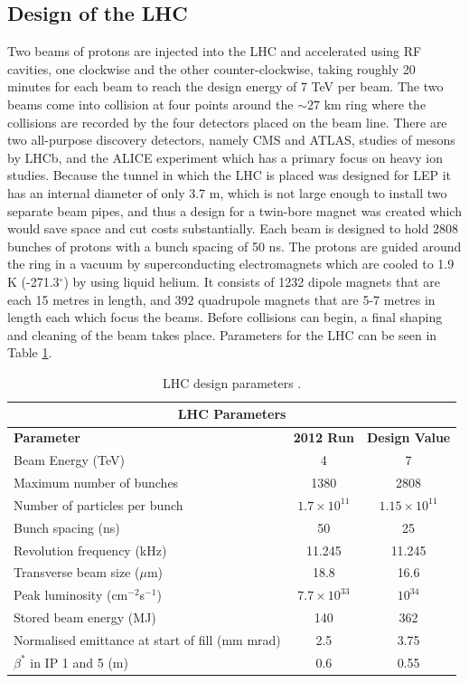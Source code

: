 \subsection{Design of the LHC}

Two beams of protons are injected into the LHC and accelerated using RF cavities, one clockwise and the other counter-clockwise, taking roughly 20 minutes for each beam to reach the design energy of 7 TeV per beam. The two beams come into collision at four points around the $\sim27$ km ring where the collisions are recorded by the four detectors placed on the beam line. There are two all-purpose discovery detectors, namely CMS and ATLAS, studies of mesons by LHCb, and the ALICE experiment which has a primary focus on heavy ion studies. Because the tunnel in which the LHC is placed was designed for LEP it has an internal diameter of only 3.7 m, which is not large enough to install two separate beam pipes, and thus a design for a twin-bore magnet \cite{LHCStorageAccelerators} was created which would save space and cut costs substantially. Each beam is designed to hold 2808 bunches of protons with a bunch spacing of 50 ns. The protons are guided around the ring in a vacuum by superconducting electromagnets which are cooled to 1.9 K (-271.3$^\circ$) by using liquid helium. It consists of 1232 dipole magnets that are each 15 metres in length, and 392 quadrupole magnets that are 5-7 metres in length each which focus the beams. Before collisions can begin, a final shaping and cleaning of the beam takes place. Parameters for the LHC can be seen in Table \ref{tab-LHCparameters}.

\begin{table} 
\begin{center}
\begin{tabular}{|l|c|c|}
\hline
	\multicolumn{3}{|c|}{\textbf{LHC Parameters}} \\
\hline
	\textbf{Parameter} & \textbf{2012 Run} & \textbf{Design Value} \\
\hline	
	Beam Energy (TeV) & 4 & 7 \\
	Maximum number of bunches  & 1380 & 2808 \\
	Number of particles per bunch & $1.7\times 10^{11}$ & $1.15\times 10^{11}$ \\
	Bunch spacing (ns) & 50 & 25 \\
	Revolution frequency (kHz) & 11.245 & 11.245 \\
	Transverse beam size ($\mu$m) & 18.8 & 16.6 \\
	Peak luminosity (cm$^{-2}$s$^{-1}$) & $7.7\times 10^{33}$ & $10^{34}$ \\
	Stored beam energy (MJ) & 140 & 362 \\
	Normalised emittance at start of fill (mm mrad) & 2.5 & 3.75 \\
	$\beta^*$ in IP 1 and 5 (m) & 0.6 & 0.55 \\
\hline
\end{tabular}
\end{center}
\caption{LHC design parameters \cite{LHCDesignReport}.}
\label{tab-LHCparameters}
\end{table}


